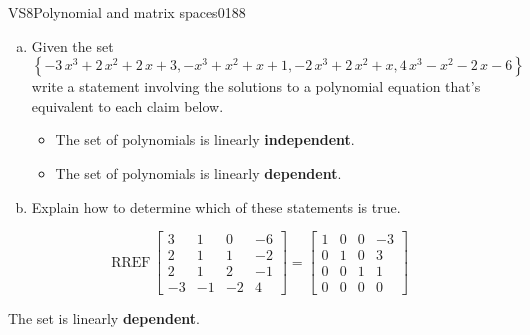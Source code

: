 \begin{exercise}{VS8}{Polynomial and matrix spaces}{0188} 
\begin{exerciseStatement} 

\begin{enumerate}[(a)]
\item  

 Given the set \[\left\{ -3 \, x^{3} + 2 \, x^{2} + 2 \, x + 3 , -x^{3} + x^{2} + x + 1 , -2 \, x^{3} + 2 \, x^{2} + x , 4 \, x^{3} - x^{2} - 2 \, x - 6 \right\}\] write a statement involving the solutions to a polynomial equation that's equivalent to each claim below. 

 

\begin{itemize}
\item  

 The set of polynomials is linearly \textbf{independent}. 

 
\item  

 The set of polynomials is linearly \textbf{dependent}. 

 
\end{itemize}

     
\item  

 Explain how to determine which of these statements is true. 

 
\end{enumerate}

     \end{exerciseStatement}
 \begin{exerciseAnswer} 

 \[
\mathrm{RREF}\, \left[\begin{array}{cccc}
3 & 1 & 0 & -6 \\
2 & 1 & 1 & -2 \\
2 & 1 & 2 & -1 \\
-3 & -1 & -2 & 4
\end{array}\right] = \left[\begin{array}{cccc}
1 & 0 & 0 & -3 \\
0 & 1 & 0 & 3 \\
0 & 0 & 1 & 1 \\
0 & 0 & 0 & 0
\end{array}\right]
            \] 

 

 The set is linearly \textbf{dependent}. 

 \end{exerciseAnswer}
 \end{exercise}


